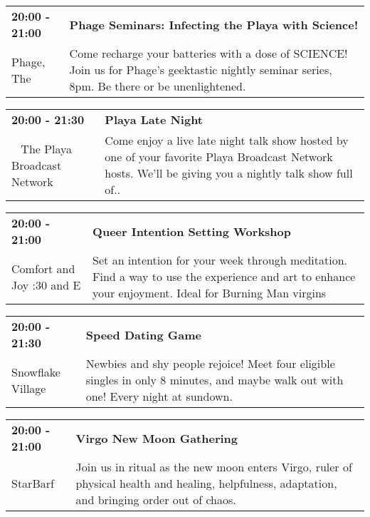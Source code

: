 \begin{tabular}{ p{1in} p{2.2in} }
    \textbf{20:00 - 21:00} & \textbf{Phage Seminars: Infecting the Playa with Science!} \\
    Phage, The \newline  & Come recharge your batteries with a dose of SCIENCE! Join us for Phage's geektastic nightly seminar series, 8pm. Be there or be unenlightened. \\
    \hline 
\end{tabular}
    
\begin{tabular}{ p{1in} p{2.2in} }
    \textbf{20:00 - 21:30} & \textbf{Playa Late Night} \\
    ~ \newline The Playa Broadcast Network & Come enjoy a live late night talk show hosted by one of your favorite Playa Broadcast Network hosts. We'll be giving you a nightly talk show full of.. \\
    \hline 
\end{tabular}
    
\begin{tabular}{ p{1in} p{2.2in} }
    \textbf{20:00 - 21:00} & \textbf{Queer Intention Setting Workshop} \\
    Comfort and Joy \newline 7:30 and E & Set an intention for your week through meditation.   Find a way to use the experience and art to enhance your enjoyment. Ideal for Burning Man virgins \\
    \hline 
\end{tabular}
    
\begin{tabular}{ p{1in} p{2.2in} }
    \textbf{20:00 - 21:30} & \textbf{Speed Dating Game} \\
    Snowflake Village \newline  & Newbies and shy people rejoice! Meet four eligible singles in only 8 minutes, and maybe walk out with one! Every night at sundown. \\
    \hline 
\end{tabular}
    
\begin{tabular}{ p{1in} p{2.2in} }
    \textbf{20:00 - 21:00} & \textbf{Virgo New Moon Gathering} \\
    StarBarf \newline  & Join us in ritual as the new moon enters Virgo, ruler of physical health and healing, helpfulness, adaptation, and bringing order out of chaos. \\
    \hline 
\end{tabular}
    
